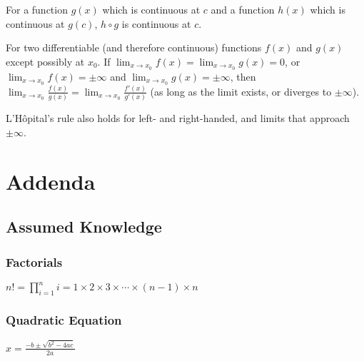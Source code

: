 \documentclass{article}
\begin{document}
%
\begin{theorem}
    For a function \(g(x)\) which is continuous at \(c\) and
    a function \(h(x)\) which is continuous at \(g(c)\),
    \(h \circ g\) is continuous at \(c\).
\end{theorem}
%
\begin{theorem}
    For two differentiable (and therefore continuous) functions \(f(x)\) and \(g(x)\)
    except possibly at \(x_0\).
    If \(\displaystyle \lim_{x\to x_0}f(x)=\lim_{x\to x_0}g(x)=0\),
    or \(\displaystyle \lim_{x\to x_0}f(x)=\pm\infty\)
    and \(\displaystyle \lim_{x\to x_0}g(x)=\pm\infty\),
    then
    \(\lim_{x\to x_0}\frac{f(x)}{g(x)} = \lim_{x\to x_0}\frac{f'(x)}{g'(x)}\)
    (as long as the limit exists, or diverges to \(\pm\infty\)).
\end{theorem}
%
\begin{note}
    L'Hôpital's rule also holds for left- and right-handed, and limits that approach \(\pm\infty\).
\end{note}
%
\pagebreak
\section{Addenda}
\subsection{Assumed Knowledge}
\subsubsection{Factorials}
\(\displaystyle n! = \prod_{i=1}^{n} i = 1 \times 2 \times 3 \times \cdots \times (n-1) \times n\)

\subsubsection{Quadratic Equation}
\(\displaystyle x = \frac{-b\pm\sqrt{b^2-4ac}}{2a}\)
\end{document}
